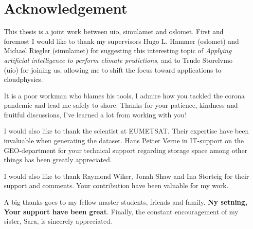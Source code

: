\chapter*{Acknowledgement}
This thesis is a joint work between \acrfull{uio}, \acrfull{simulamet} and \acrfull{oslomet}. First and foremost I would like to thank my supervisors Hugo L. Hammer (\acrshort{oslomet}) and Michael Riegler (\acrshort{simulamet}) for suggesting this interesting topic of \textit{Applying artificial intelligence to perform climate predictions}, and to Trude Storelvmo (\acrshort{uio}) for joining us, allowing me to shift the focus toward applications to cloudphysics.

It is a poor workman who blames his tools, I admire how you tackled the corona pandemic and lead me safely to shore. Thanks for your patience, kindness and fruitful discussions, I've learned a lot from working with you!

I would also like to thank the scientist at EUMETSAT. 
Their expertise have been invaluable when generating the dataset. 
Hans Petter Verne in IT-support on the GEO-department for your technical support regarding storage space among other things has been greatly appreciated.

I would also like to thank Raymond Wiker, Jonah Shaw and Ina Storteig for their support and comments. Your contribution have been valuable for my work.

A big thanks goes to my fellow master students, friends and family. \textbf{Ny setning, Your support have been great}. Finally, the constant encouragement of my sister, Sara, is sincerely appreciated.
\cleardoublepage